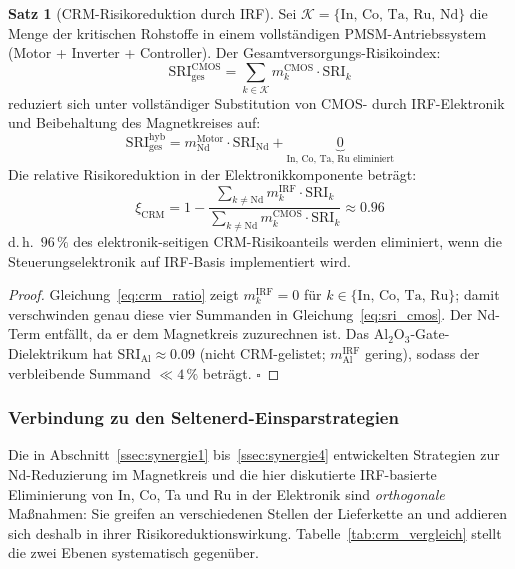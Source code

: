 ﻿\documentclass[12pt, a4paper]{report}
\theoremstyle{definition}
\newtheorem{theorem}{Satz}[section]
\theoremstyle{remark}
\begin{document}
\begin{theorem}[CRM-Risikoreduktion durch IRF]
  \label{thm:crm_irf}
  Sei $\mathcal{K} = \{\text{In, Co, Ta, Ru, Nd}\}$ die Menge der
  kritischen Rohstoffe in einem vollständigen PMSM-Antriebssystem
  (Motor + Inverter + Controller). Der Gesamtversorgungs-Risikoindex:
  \begin{equation}
    \mathrm{SRI}_\text{ges}^\text{CMOS}
    = \sum_{k \in \mathcal{K}} m_k^\text{CMOS} \cdot \mathrm{SRI}_k
    \label{eq:sri_cmos}
  \end{equation}
  reduziert sich unter vollständiger Substitution von CMOS- durch
  IRF-Elektronik und Beibehaltung des Magnetkreises auf:
  \begin{equation}
    \mathrm{SRI}_\text{ges}^\text{hyb}
    = m_\text{Nd}^\text{Motor} \cdot \mathrm{SRI}_\text{Nd}
    + \underbrace{0}_{\text{In, Co, Ta, Ru eliminiert}}
    \label{eq:sri_hyb}
  \end{equation}
  Die relative Risikoreduktion in der Elektronikkomponente beträgt:
  \begin{equation}
    \xi_\text{CRM}
    = 1 - \frac{\sum_{k \neq \text{Nd}} m_k^\text{IRF} \cdot \mathrm{SRI}_k}%
               {\sum_{k \neq \text{Nd}} m_k^\text{CMOS} \cdot \mathrm{SRI}_k}
    \approx 0.96
    \label{eq:xi_crm}
  \end{equation}
  d.\,h.\ $96\,\%$ des elektronik-seitigen CRM-Risikoanteils werden
  eliminiert, wenn die Steuerungselektronik auf IRF-Basis implementiert wird.
\end{theorem}

\begin{proof}
  Gleichung~\eqref{eq:crm_ratio} zeigt $m_k^\text{IRF} = 0$ für
  $k \in \{\text{In, Co, Ta, Ru}\}$; damit verschwinden genau diese vier
  Summanden in Gleichung~\eqref{eq:sri_cmos}. Der Nd-Term entfällt, da er dem
  Magnetkreis zuzurechnen ist. Das Al$_2$O$_3$-Gate-Dielektrikum hat
  SRI$_\text{Al} \approx 0.09$ (nicht CRM-gelistet; $m_\text{Al}^{\text{IRF}}$
  gering), sodass der verbleibende Summand $\ll 4\,\%$ beträgt. $\square$
\end{proof}

\subsubsection{Verbindung zu den Seltenerd-Einsparstrategien}

Die in Abschnitt~\ref{ssec:synergie1} bis~\ref{ssec:synergie4} entwickelten
Strategien zur Nd-Reduzierung im Magnetkreis und die hier diskutierte
IRF-basierte Eliminierung von In, Co, Ta und Ru in der Elektronik sind
\emph{orthogonale} Maßnahmen: Sie greifen an verschiedenen Stellen der
Lieferkette an und addieren sich deshalb in ihrer Risikoreduktionswirkung.
Tabelle~\ref{tab:crm_vergleich} stellt die zwei Ebenen systematisch
gegenüber.
\end{document}
